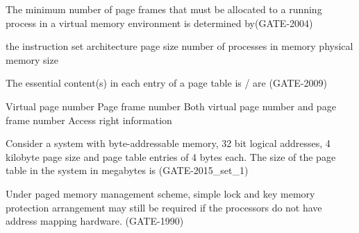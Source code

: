 
\begin{questyle}

  \question  The minimum number of page frames that must be allocated to a running process in a virtual memory
            environment is determined by(GATE-2004)

  \begin{choices}
    \choice the instruction set architecture
    \choice page size
    \choice number of processes in memory
    \choice physical memory size
  \end{choices}

\end{questyle}


\begin{questyle}

  \question  The essential content(s) in each entry of a page table is / are (GATE-2009)

  \begin{choices}
    \choice Virtual page number
    \choice Page frame number
    \choice Both virtual page number and page frame number
    \choice Access right information
  \end{choices}

\end{questyle}


\begin{questyle}

  \question  Consider a system with byte-addressable memory, 32 bit logical addresses, 4 kilobyte page size and page table entries of 4 bytes each. The size of the page table in the system in megabytes is \fillin[] (GATE-2015\_set\_1)

\end{questyle}


\begin{questyle}

  \question  Under paged memory management scheme, simple lock and key memory protection arrangement may still be required if the \fillin[] processors do not have address mapping hardware. (GATE-1990)

\end{questyle}

